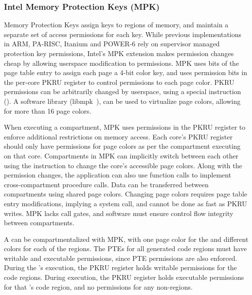 \subsubsection{Intel Memory Protection Keys (MPK)}
Memory Protection Keys assign keys to regions of memory, and maintain
a separate set of access permissions for each key.
While previous implementations in ARM, PA-RISC, Itanium and POWER-6 rely on 
supervisor managed protection key permissions, Intel's MPK extension
makes permission changes cheap by allowing userspace modification to
permissions.
MPK uses bits of the page table entry to assign each page a 4-bit color key,
and uses permission bits in the per-core PKRU register to control permissions
to each page color.
PKRU permissions can be arbitrarily changed by userspace, using a special
instruction ().
A software library (libmpk~\cite{ParkLXMK19}), can be used to virtualize 
page colors, allowing for more than 16 page colors.

When executing a compartment, MPK uses permissions in the PKRU register
to enforce additional restrictions on memory access. 
Each core's PKRU register should only have permissions for page colors as
per the compartment executing on that core.
Compartments in MPK can implicitly switch between each other using the 
 instruction to change the core's accessible page colors.
Along with the permission changes, the application can also use 
function calls to implement cross-compartment procedure calls.
Data can be transferred between compartments using shared page colors.
Changing page colors requires page table entry modifications, implying a
system call, and cannot be done as fast as PKRU writes.
MPK lacks call gates, and software must ensure control flow integrity
between compartments.

A \browser can be compartmentalized with MPK, with one page color for the 
\renderer and different colors for each of the \sandbox regions.
The PTEs for all generated code regions must have writable and executable
permissions, since PTE permissions are also enforced.
During the \renderer's execution, the PKRU register holds writable permissions
for the \sandbox code regions.
During \sandbox execution, the PKRU register holds executable permissions for 
that \sandbox's code region, and no permissions for any non-\sandbox regions.

